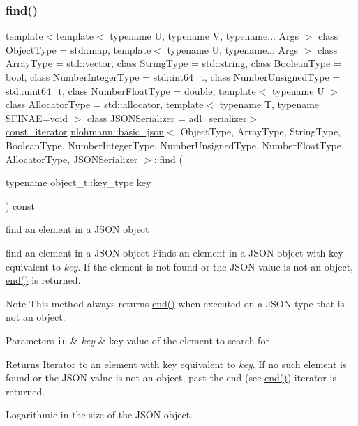 \subsubsection{\texorpdfstring{find()}{find()}\hspace{0.1cm}{\footnotesize\ttfamily [2/2]}}
{\footnotesize\ttfamily template$<$template$<$ typename U, typename V, typename... Args $>$ class Object\+Type = std\+::map, template$<$ typename U, typename... Args $>$ class Array\+Type = std\+::vector, class String\+Type  = std\+::string, class Boolean\+Type  = bool, class Number\+Integer\+Type  = std\+::int64\+\_\+t, class Number\+Unsigned\+Type  = std\+::uint64\+\_\+t, class Number\+Float\+Type  = double, template$<$ typename U $>$ class Allocator\+Type = std\+::allocator, template$<$ typename T, typename S\+F\+I\+N\+A\+E=void $>$ class J\+S\+O\+N\+Serializer = adl\+\_\+serializer$>$ \\
\mbox{\hyperlink{classnlohmann_1_1basic__json_a41a70cf9993951836d129bb1c2b3126a}{const\+\_\+iterator}} \mbox{\hyperlink{classnlohmann_1_1basic__json}{nlohmann\+::basic\+\_\+json}}$<$ Object\+Type, Array\+Type, String\+Type, Boolean\+Type, Number\+Integer\+Type, Number\+Unsigned\+Type, Number\+Float\+Type, Allocator\+Type, J\+S\+O\+N\+Serializer $>$\+::find (\begin{DoxyParamCaption}\item[{typename object\+\_\+t\+::key\+\_\+type}]{key }\end{DoxyParamCaption}) const\hspace{0.3cm}{\ttfamily [inline]}}



find an element in a J\+S\+ON object 

find an element in a J\+S\+ON object Finds an element in a J\+S\+ON object with key equivalent to {\itshape key}. If the element is not found or the J\+S\+ON value is not an object, \mbox{\hyperlink{classnlohmann_1_1basic__json_a13e032a02a7fd8a93fdddc2fcbc4763c}{end()}} is returned.

\begin{DoxyNote}{Note}
This method always returns \mbox{\hyperlink{classnlohmann_1_1basic__json_a13e032a02a7fd8a93fdddc2fcbc4763c}{end()}} when executed on a J\+S\+ON type that is not an object.
\end{DoxyNote}

\begin{DoxyParams}[1]{Parameters}
\mbox{\tt in}  & {\em key} & key value of the element to search for\\
\hline
\end{DoxyParams}
\begin{DoxyReturn}{Returns}
Iterator to an element with key equivalent to {\itshape key}. If no such element is found or the J\+S\+ON value is not an object, past-\/the-\/end (see \mbox{\hyperlink{classnlohmann_1_1basic__json_a13e032a02a7fd8a93fdddc2fcbc4763c}{end()}}) iterator is returned.
\end{DoxyReturn}
Logarithmic in the size of the J\+S\+ON object.

